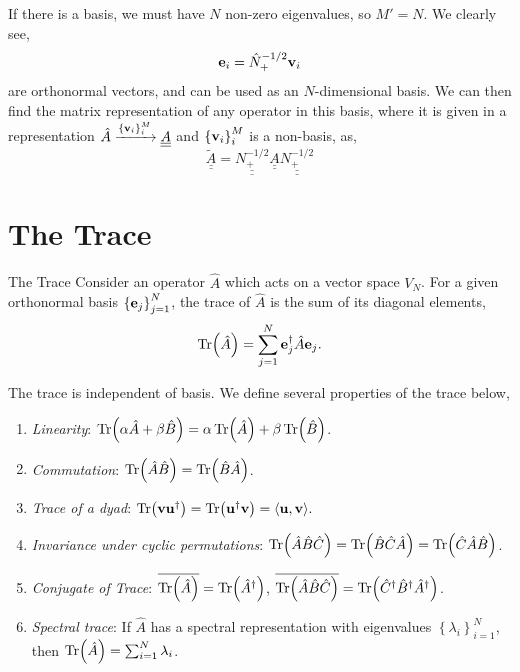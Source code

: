 \documentclass{book}
\def\innerproduct#1#2{{\langle #1},{#2 \rangle}}
\def\doubleunderline#1{\underline{\underline{#1}}}
\begin{document}
If there is a basis, we must have $N$ non-zero eigenvalues, so $M' = N$. We clearly see,
\begin{equation}
	\vb{e}_i = \hat{N}_+^{-1/2}\vb{v}_i
\end{equation}
are orthonormal vectors, and can be used as an $N$-dimensional basis. We can then find the matrix representation of any operator in this basis, where it is given in a representation $\hat{A} \xrightarrow{\left\{\vb{v}_i\right\}_{i}^M} \doubleunderline{A}$ and $\left\{\vb{v}_i\right\}_{i}^M$ is a non-basis, as,
\begin{equation}
	\tilde{\doubleunderline{A}} = \doubleunderline{N_{+}^{-1/2}}\doubleunderline{A}\doubleunderline{N_{+}^{-1/2}}
\end{equation}
\section{The Trace}
\begin{Definitions}{The Trace}{}
	Consider an operator $\hat{A}$ which acts on a vector space $V_N$. For a given orthonormal basis $\left\{\vb{e}_j\right\}_{j=1}^N$, the trace of $\hat{A}$ is the sum of its diagonal elements,
	\begin{equation}
		\Tr(\hat{A}) = \sum_{j=1}^N\vb{e}_j^{\dag}\hat{A}\vb{e}_j.
	\end{equation}
\end{Definitions}
The trace is independent of basis. We define several properties of the trace below,
\begin{enumerate}
	\item \textit{Linearity}: $\Tr(\alpha \hat{A} + \beta \hat{B}) = \alpha\Tr(\hat{A}) + \beta\Tr(\hat{B})$.
	\item \textit{Commutation}: $\Tr(\hat{A}\hat{B}) = \Tr(\hat{B}\hat{A})$.
	\item \textit{Trace of a dyad}: $\Tr(\vb{v}\vb{u}^{\dag}) = \Tr(\vb{u}^{\dag}\vb{v}) = \innerproduct{\vb{u}}{\vb{v}}.$
	\item \textit{Invariance under cyclic permutations}: $\Tr(\hat{A}\hat{B}\hat{C}) = \Tr(\hat{B}\hat{C}\hat{A}) = \Tr(\hat{C}\hat{A}\hat{B})$.
	\item \textit{Conjugate of Trace}: $\overline{\Tr(\hat{A})} = \Tr(\hat{A}^{\dag})$, $\overline{\Tr(\hat{A}\hat{B}\hat{C})} = \Tr(\hat{C}^{\dag}\hat{B}^{\dag}\hat{A}^{\dag})$.
	\item \textit{Spectral trace}: If $\hat{A}$ has a spectral representation with eigenvalues $\left\{\lambda_i\right\}_{i=1}^N$, then $\Tr(\hat{A}) = \sum_{i=1}^N\lambda_i$.
\end{enumerate}
\end{document}
